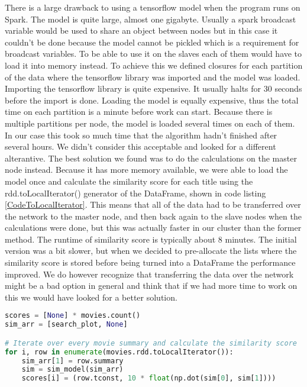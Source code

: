 There is a large drawback to using a tensorflow model when the program runs on Spark. The model is quite large, almost one gigabyte. Usually a spark broadcast variable would be used to share an object between nodes but in this case it couldn’t be done because the model cannot be pickled which is a requirement for broadcast variables. To be able to use it on the slaves each of them would have to load it into memory instead. To achieve this we defined closures for each partition of the data where the tensorflow library was imported and the model was loaded. Importing the tensorflow library is quite expensive. It usually halts for 30 seconds before the import is done. Loading the model is equally expensive, thus the total time on each partition is a minute before work can start. Because there is multiple partitions per node, the model is loaded several times on each of them. In our case this took so much time that the algorithm hadn’t finished after several hours. We didn’t consider this acceptable and looked for a different alterantive. The best solution we found was to do the calculations on the master node instead. Because it has more memory available, we were able to load the model once and calculate the similarity score for each title using the rdd.toLocalIterator() generator of the DataFrame, shown in code listing \ref{CodeToLocalIterator}. This means that all of the data had to be transferred over the network to the master node, and then back again to the slave nodes when the calculations were done, but this was actually faster in our cluster than the former method. The runtime of similarity score is typically about 8 minutes. The initial version was a bit slower, but when we decided to pre-allocate the lists where the similarity score is stored before being turned into a DataFrame the performance improved. We do however recognize that transferring the data over the network might be a bad option in general and think that if we had more time to work on this we would have looked for a better solution.

\begin{lstlisting}[language=Python, caption=Plot similarity, label=CodeToLocalIterator, breaklines=true]
scores = [None] * movies.count()
sim_arr = [search_plot, None]

# Iterate over every movie summary and calculate the similarity score
for i, row in enumerate(movies.rdd.toLocalIterator()):
    sim_arr[1] = row.summary
    sim = sim_model(sim_arr)
    scores[i] = (row.tconst, 10 * float(np.dot(sim[0], sim[1])))
\end{lstlisting}

